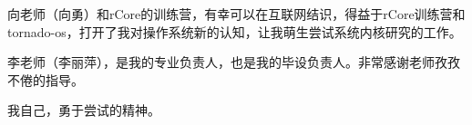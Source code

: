 \thanking


向老师（向勇）和rCore的训练营，有幸可以在互联网结识，得益于rCore训练营和tornado-os，打开了我对操作系统新的认知，让我萌生尝试系统内核研究的工作。

李老师（李丽萍），是我的专业负责人，也是我的毕设负责人。非常感谢老师孜孜不倦的指导。

我自己，勇于尝试的精神。

